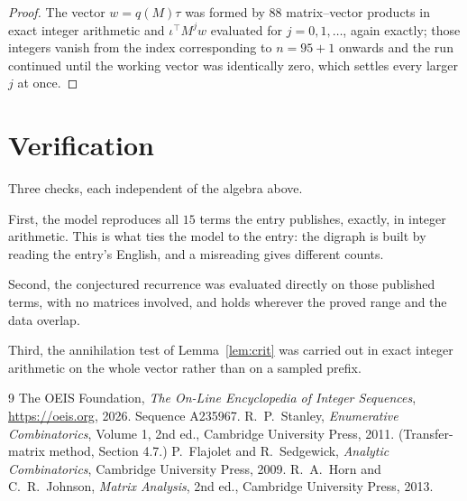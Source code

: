 \documentclass[11pt,a4paper]{article}
\theoremstyle{plain}
\theoremstyle{definition}
\begin{document}
\begin{proof}
The vector $w=q(M)\tau$ was formed by $88$ matrix--vector products in exact integer
arithmetic and $\iota^{\!\top}M^{j}w$ evaluated for $j=0,1,\dots$, again exactly; those
integers vanish from the index corresponding to $n=95+1$ onwards and the run continued
until the working vector was identically zero, which settles every larger $j$ at once.
\end{proof}

\section{Verification}

Three checks, each independent of the algebra above.

First, the model reproduces all $15$ terms the entry publishes, exactly, in integer
arithmetic. This is what ties the model to the entry: the digraph is built by reading the
entry's English, and a misreading gives different counts.

Second, the conjectured recurrence was evaluated directly on those published terms, with no
matrices involved, and holds wherever the proved range and the data overlap.

Third, the annihilation test of Lemma~\ref{lem:crit} was carried out in exact integer
arithmetic on the whole vector rather than on a sampled prefix.

\begin{thebibliography}{9}
 The OEIS Foundation, \emph{The On-Line Encyclopedia of Integer
Sequences}, \url{https://oeis.org}, 2026. Sequence A235967.
 R.~P.~Stanley, \emph{Enumerative Combinatorics}, Volume 1, 2nd ed.,
Cambridge University Press, 2011. (Transfer-matrix method, Section 4.7.)
 P.~Flajolet and R.~Sedgewick, \emph{Analytic Combinatorics}, Cambridge
University Press, 2009.
 R.~A.~Horn and C.~R.~Johnson, \emph{Matrix Analysis}, 2nd ed., Cambridge
University Press, 2013.
\end{thebibliography}
\end{document}
